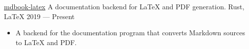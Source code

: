 \showoff
{\textcolor{my-blue}{\href{https://github.com/lbeckman314/mdbook-latex}{mdbook-latex}}}
{A documentation backend for \LaTeX{} and PDF generation.}
{Rust, \LaTeX{}}
{2019 --- Present}

\begin{itemize}
    \item A backend for the  documentation program that converts Markdown sources to \LaTeX{} and PDF.
\end{itemize}

